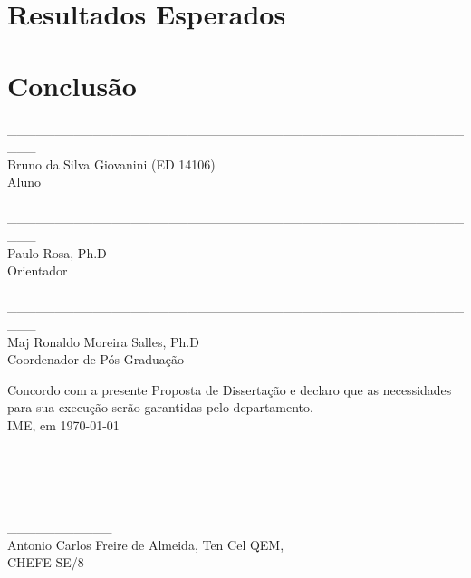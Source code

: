 \documentclass[a4paper, 12pt]{article}
\begin{document}
\section{Resultados Esperados}
\label{sec:resultados}

\newpage

\section{Conclusão}
\label{sec:conclusao}

\newpage


 

\newpage

\begin{center}
\_\_\_\_\_\_\_\_\_\_\_\_\_\_\_\_\_\_\_\_\_\_\_\_\_\_\_\_\_\_\_\_\_\_\_\_\_\_\_\_\_\_\_\_\_\_\_\_\_\_\_ \\

Bruno da Silva Giovanini (ED 14106) \\Aluno \\ 
 
\hspace{4cm}
\\


\_\_\_\_\_\_\_\_\_\_\_\_\_\_\_\_\_\_\_\_\_\_\_\_\_\_\_\_\_\_\_\_\_\_\_\_\_\_\_\_\_\_\_\_\_\_\_\_\_\_\_ \\
Paulo Rosa, Ph.D \\Orientador \\ 

\hspace{4cm}
\\


\_\_\_\_\_\_\_\_\_\_\_\_\_\_\_\_\_\_\_\_\_\_\_\_\_\_\_\_\_\_\_\_\_\_\_\_\_\_\_\_\_\_\_\_\_\_\_\_\_\_\_ \\
Maj Ronaldo Moreira Salles, Ph.D \\Coordenador de Pós-Graduação \\

\hspace{4cm}

\end{center}
Concordo com a presente Proposta de Dissertação e declaro que as necessidades para sua execução serão garantidas pelo departamento. \\
IME, em \today
 \hspace{4cm}
 \\
 \\
 \\
 \\
 
\begin{center}
\_\_\_\_\_\_\_\_\_\_\_\_\_\_\_\_\_\_\_\_\_\_\_\_\_\_\_\_\_\_\_\_\_\_\_\_\_\_\_\_\_\_\_\_\_\_\_\_\_\_\_\_\_\_\_\_\_\_\_ \\
Antonio Carlos Freire de Almeida, Ten Cel QEM, \\
CHEFE SE/8
\end{center}
\end{document}
